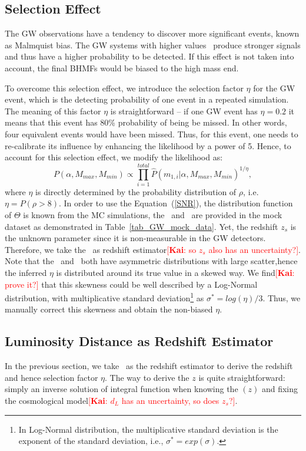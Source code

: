 \documentclass[twocolumn]{aastex62}
\newcommand{\kai}[1]{\textcolor{red}{[{\bf Kai}: #1]}}
\begin{document}
\subsection{Selection Effect}\label{sec_likelihood_sf}
The GW observations have a tendency to discover more significant events, known as Malmquist bias. The GW systems with higher values \mone\ produce  stronger signals and thus have a higher probability to be detected. If this effect is not taken into account, the final BHMFs would be biased to the high mass end.

To overcome this selection effect, we introduce the selection factor $\eta$ for the GW event, which is the detecting probability of one event in a repeated simulation. The meaning of this factor $\eta$ is straightforward -- if one GW event has $\eta=0.2$ it means that this event has 80\% probability of being be missed. In other words, four equivalent events would have been missed. Thus, for this event, one needs to re-calibrate its influence by  enhancing the likelihood by a power of 5. Hence, to account for this  selection effect, we modify the likelihood as:
 \begin{equation} \label{equ_lik_sf}
 P(\alpha, M_{max}, M_{min}) \propto  \prod_{i=1}^{total} \hat{P}(m_{1,i}|\alpha, M_{max}, M_{min})^{1/\eta},
 \end{equation}
where $\eta$ is directly determined by the probability distribution of $\rho$, i.e. $\eta = P(\rho>8)$. In order to use the Equation~(\ref{SNR}), the distribution function of $\Theta$ is known from the MC simulations, the \cmass\ and \dl\ are provided in the mock dataset as demonstrated in Table~\ref{tab_GW_mock_data}. Yet, the redshift $z_s$ is the unknown parameter since it is non-measurable in the GW detectors. Therefore, we take the \dl\ as redshift estimator\kai{so $z_s$ also has an uncertainty?}.
Note that the \dl\ and \cmass\ both have asymmetric distributions with large scatter,hence the inferred $\eta$ is distributed around its true value in a skewed way. We find\kai{prove it?} that this skewness could be well described by a Log-Normal distribution, with multiplicative standard deviation\footnote{In Log-Normal distribution, the multiplicative standard deviation is the exponent  of the standard deviation, i.e., $\sigma^* = exp(\sigma)$.} as $\sigma^*=log(\eta)/3$. Thus, we manually correct this skewness and obtain the non-biased $\eta$.

\subsection{Luminosity Distance as Redshift Estimator} 
\label{sec_dl_z}
In the previous section, we take \dl\ as the redshift estimator to derive the redshift and hence selection factor $\eta$. The way to derive the $z$ is quite straightforward: simply an inverse solution of integral function when knowing the \dl$(z)$ and fixing the cosmological model\kai{$d_L$ has an uncertainty, so does $z_s$?}.
\end{document}
